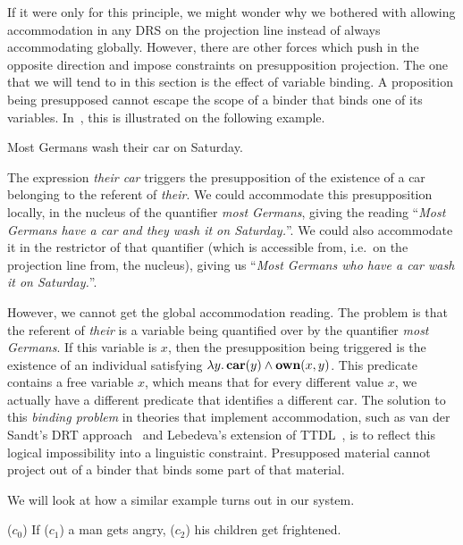If it were only for this principle, we might wonder why we bothered with
allowing accommodation in any DRS on the projection line instead of always
accommodating globally. However, there are other forces which push in the
opposite direction and impose constraints on presupposition projection. The
one that we will tend to in this section is the effect of variable
binding. A proposition being presupposed cannot escape the scope of a
binder that binds one of its variables. In~\cite{sep-presupposition}, this
is illustrated on the following example.

\begin{exe}
  \ex \label{ex:most-germans-wash} Most Germans wash their car on Saturday.
\end{exe}

The expression \emph{their car} triggers the presupposition of the
existence of a car belonging to the referent of \emph{their}. We could
accommodate this presupposition locally, in the nucleus of the quantifier
\emph{most Germans}, giving the reading ``\emph{Most Germans have a car and
  they wash it on Saturday.}''. We could also accommodate it in the
restrictor of that quantifier (which is accessible from, i.e.\ on the
projection line from, the nucleus), giving us ``\emph{Most Germans who have
  a car wash it on Saturday.}''.

However, we cannot get the global accommodation reading. The problem is
that the referent of \emph{their} is a variable being quantified over by
the quantifier \emph{most Germans}. If this variable is $x$, then the
presupposition being triggered is the existence of an individual satisfying
$\lambda y.\, \textbf{car}(y) \land \textbf{own}(x, y)$. This predicate contains a
free variable $x$, which means that for every different value $x$, we
actually have a different predicate that identifies a different car. The
solution to this \emph{binding problem} in theories that implement
accommodation, such as van der Sandt's DRT
approach~\cite{van1992presupposition} and Lebedeva's extension of
TTDL~\cite{lebedeva2012expression}, is to reflect this logical
impossibility into a linguistic constraint. Presupposed material cannot
project out of a binder that binds some part of that material.

We will look at how a similar example turns out in our system.

\begin{exe}
  \ex \label{ex:man-angry} ($c_0$) If ($c_1$) a man gets angry, ($c_2$) his
  children get frightened.
\end{exe}

